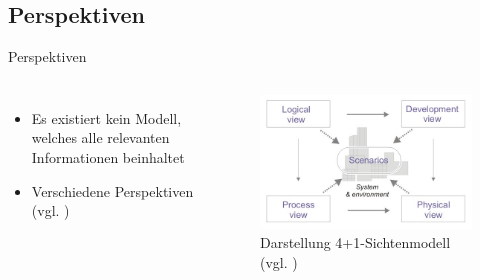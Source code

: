\documentclass{beamer}
\begin{document}
		\subsection{Perspektiven}
			\begin{frame}{Perspektiven}
				\begin{columns}
				\begin{itemize}
					\item Es existiert kein Modell, welches alle relevanten Informationen beinhaltet
					\item Verschiedene Perspektiven (vgl. \cite{4+1})
				\end{itemize}
			   	\begin{figure}
					\includegraphics[width=\textwidth]{4+1.jpg}
					\caption{Darstellung 4+1-Sichtenmodell (vgl. \cite{4+1pic})}
				\end{figure}
			\end{columns}
			\end{frame}
\end{document}
